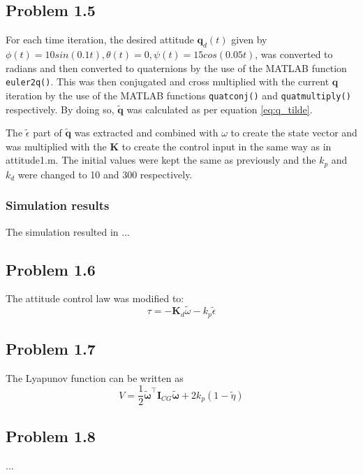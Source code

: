 

\subsection*{Problem 1.5}
For each time iteration, the desired attitude $\mathbf{q}_d(t)$ given by $\phi(t) = 10sin(0.1t), \theta(t) = 0, \psi(t) = 15cos(0.05t)$, was converted to radians and then converted to quaternions by the use of the MATLAB function \texttt{euler2q()}. This was then conjugated and cross multiplied with the current $\mathbf{q}$ iteration by the use of the MATLAB functions \texttt{quatconj()} and \texttt{quatmultiply()} respectively. By doing so, $\mathbf{\tilde{q}}$ was calculated as per equation \eqref{eq:q_tilde}.

The $\tilde{\epsilon}$ part of $\mathbf{\tilde{q}}$ was extracted and combined with $\omega$ to create the state vector and was multiplied with the $\mathbf{K}$ to create the control input in the same way as in {\color{blue} attitude1.m}. The initial values were kept the same as previously and the $k_p$ and $k_d$ were changed to 10 and 300 respectively. 

\subsubsection*{Simulation results}

The simulation resulted in ...



\subsection*{Problem 1.6}

The attitude control law was modified to:
\begin{equation}
    \tau = -\mathbf{K}_d\tilde{\omega} -k_p\tilde{\epsilon}
    \label{eq:control_law_attitude3}
\end{equation}

\subsection*{Problem 1.7}
The Lyapunov function can be written as 
 \begin{equation}
	 V = \frac{1}{2} \tilde{\boldsymbol{\omega}}^{\top} \mathbf{I}_{CG}\tilde{\boldsymbol{\omega}} + 2 k_p (1-\tilde{\eta})
 \end{equation}

\subsection*{Problem 1.8}
...



